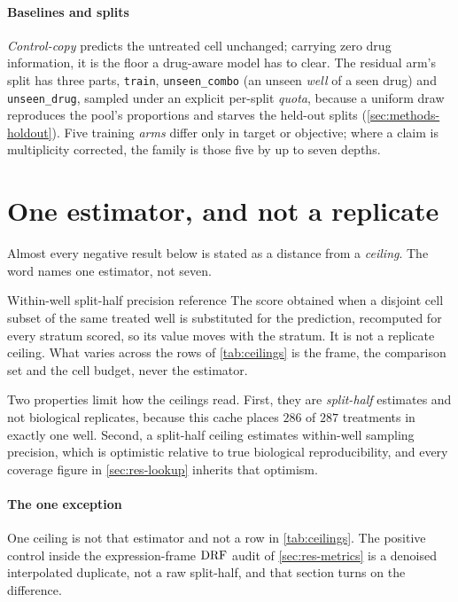 \paragraph{Baselines and splits} \emph{Control-copy} predicts the untreated cell
unchanged; carrying zero drug information, it is the floor a drug-aware model
has to clear. The residual arm's split has three parts,
\texttt{train}, \texttt{unseen\_combo} (an unseen \emph{well} of a seen drug)
and \texttt{unseen\_drug}, sampled under an explicit per-split \emph{quota},
because a uniform draw reproduces the pool's proportions and starves the
held-out splits (\cref{sec:methods-holdout}). Five training \emph{arms} differ
only in target or objective; where a claim is multiplicity corrected, the family
is those five by up to seven depths.

\section{One estimator, and not a replicate}

Almost every negative result below is stated as a distance from a
\emph{ceiling}. The word names one estimator, not seven.

\begin{defn}{Within-well split-half precision reference}
The score obtained when a disjoint cell subset of the same treated well is
substituted for the prediction, recomputed for every stratum scored, so its
value moves with the stratum. It is not a replicate ceiling. What varies across
the rows of \cref{tab:ceilings} is the frame, the comparison set and the cell
budget, never the estimator.
\end{defn}

Two properties limit how the ceilings read. First, they are \emph{split-half}
estimates and not biological replicates, because this cache places $286$ of
$287$ treatments in exactly one well. Second, a split-half ceiling estimates
within-well sampling precision, which is optimistic relative to true biological
reproducibility, and every coverage figure in \cref{sec:res-lookup} inherits
that optimism.

\paragraph{The one exception} One ceiling is not that estimator and not a row in
\cref{tab:ceilings}. The positive control inside the expression-frame $\textrm{DRF}$
audit of \cref{sec:res-metrics} is a denoised interpolated duplicate, not a raw
split-half, and that section turns on the difference.

